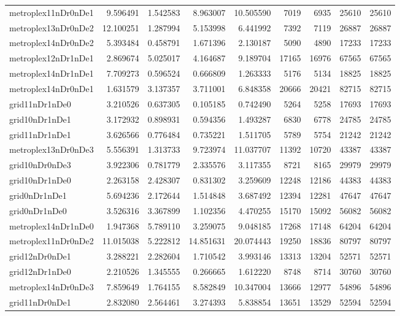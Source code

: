 \begin{longtable}{|l|r|r|r|r|r|r|r|r|}
metroplex11nDr0nDe1 & 9.596491 & 1.542583 & 8.963007 & 10.505590 & 7019 & 6935 & 25610 & 25610 \\
metroplex13nDr0nDe2 & 12.100251 & 1.287994 & 5.153998 & 6.441992 & 7392 & 7119 & 26887 & 26887 \\
metroplex14nDr0nDe2 & 5.393484 & 0.458791 & 1.671396 & 2.130187 & 5090 & 4890 & 17233 & 17233 \\
metroplex12nDr1nDe1 & 2.869674 & 5.025017 & 4.164687 & 9.189704 & 17165 & 16976 & 67565 & 67565 \\
metroplex14nDr1nDe1 & 7.709273 & 0.596524 & 0.666809 & 1.263333 & 5176 & 5134 & 18825 & 18825 \\
metroplex14nDr0nDe1 & 1.631579 & 3.137357 & 3.711001 & 6.848358 & 20666 & 20421 & 82715 & 82715 \\
grid11nDr1nDe0 & 3.210526 & 0.637305 & 0.105185 & 0.742490 & 5264 & 5258 & 17693 & 17693 \\
grid10nDr1nDe1 & 3.172932 & 0.898931 & 0.594356 & 1.493287 & 6830 & 6778 & 24785 & 24785 \\
grid11nDr1nDe1 & 3.626566 & 0.776484 & 0.735221 & 1.511705 & 5789 & 5754 & 21242 & 21242 \\
metroplex13nDr0nDe3 & 5.556391 & 1.313733 & 9.723974 & 11.037707 & 11392 & 10720 & 43387 & 43387 \\
grid10nDr0nDe3 & 3.922306 & 0.781779 & 2.335576 & 3.117355 & 8721 & 8165 & 29979 & 29979 \\
grid10nDr1nDe0 & 2.263158 & 2.428307 & 0.831302 & 3.259609 & 12248 & 12186 & 44383 & 44383 \\
grid0nDr1nDe1 & 5.694236 & 2.172644 & 1.514848 & 3.687492 & 12394 & 12281 & 47647 & 47647 \\
grid0nDr1nDe0 & 3.526316 & 3.367899 & 1.102356 & 4.470255 & 15170 & 15092 & 56082 & 56082 \\
metroplex14nDr1nDe0 & 1.947368 & 5.789110 & 3.259075 & 9.048185 & 17268 & 17148 & 64204 & 64204 \\
metroplex11nDr0nDe2 & 11.015038 & 5.222812 & 14.851631 & 20.074443 & 19250 & 18836 & 80797 & 80797 \\
grid12nDr0nDe1 & 3.288221 & 2.282604 & 1.710542 & 3.993146 & 13313 & 13204 & 52571 & 52571 \\
grid12nDr1nDe0 & 2.210526 & 1.345555 & 0.266665 & 1.612220 & 8748 & 8714 & 30760 & 30760 \\
metroplex14nDr0nDe3 & 7.859649 & 1.764155 & 8.582849 & 10.347004 & 13666 & 12977 & 54896 & 54896 \\
grid11nDr0nDe1 & 2.832080 & 2.564461 & 3.274393 & 5.838854 & 13651 & 13529 & 52594 & 52594 \\

\end{longtable}
